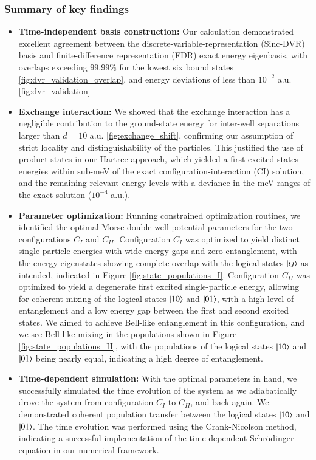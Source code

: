 \documentclass{subfiles}
\begin{document}
\subsubsection*{Summary of key findings}
\begin{itemize}
    \item \textbf{Time-independent basis construction:} Our calculation demonstrated excellent agreement between the discrete-variable-representation (Sinc-DVR) basis and finite-difference representation (FDR) exact energy eigenbasis, with overlaps exceeding $99.99\%$ for the lowest six bound states \ref{fig:dvr_validation_overlap}, and energy deviations of less than $10^{-2}$ a.u. \ref{fig:dvr_validation}
    \item \textbf{Exchange interaction:} We showed that the exchange interaction has a negligible contribution to the ground-state energy for inter-well separations larger than $d = 10$ a.u. \ref{fig:exchange_shift}, confirming our assumption of strict locality and distinguishability of the particles. This justified the use of product states in our Hartree approach, which yielded a first excited-states energies within sub-meV of the exact configuration-interaction (CI) solution, and the remaining relevant energy levels with a deviance in the meV ranges of the exact solution ($10^{-4}$ a.u.).
    \item \textbf{Parameter optimization:} Running constrained optimization routines, we identified the optimal Morse double-well potential parameters for the two configurations $C_I$ and $C_{II}$. Configuration $C_I$ was optimized to yield distinct single-particle energies with wide energy gaps and zero entanglement, with the energy eigenstates showing complete overlap with the logical states $\ket{ij}$ as intended, indicated in Figure \ref{fig:state_populations_I}. Configuration $C_{II}$ was optimized to yield a degenerate first excited single-particle energy, allowing for coherent mixing of the logical states $\ket{10}$ and $\ket{01}$, with a high level of entanglement and a low energy gap between the first and second excited states. We aimed to achieve Bell-like entanglement in this configuration, and we see Bell-like mixing in the populations shown in Figure \ref{fig:state_populations_II}, with the populations of the logical states $\ket{10}$ and $\ket{01}$ being nearly equal, indicating a high degree of entanglement.
    \item \textbf{Time-dependent simulation:} With the optimal parameters in hand, we successfully simulated the time evolution of the system as we adiabatically drove the system from configuration $C_I$ to $C_{II}$, and back again. We demonstrated coherent population transfer between the logical states $\ket{10}$ and $\ket{01}$. The time evolution was performed using the Crank-Nicolson method, indicating a successful implementation of the time-dependent Schrödinger equation in our numerical framework. 

\end{itemize}
\end{document}
